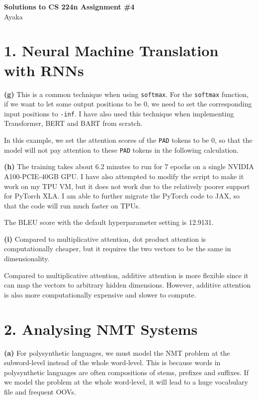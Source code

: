 \documentclass[a4paper,12pt]{report}
\author{Ayaka}
\begin{document}
\begin{center}
	{\Large{\textbf{Solutions to CS 224n Assignment \#4}}} \\
	\vspace{1em}
	{Ayaka}
\end{center}

\section*{1. Neural Machine Translation with RNNs}

\textbf{(g)} This is a common technique when using \texttt{softmax}. For the \texttt{softmax} function, if we want to let some output positions to be 0, we need to set the corresponding input positions to \texttt{-inf}. I have also used this technique when implementing Transformer, BERT and BART from scratch.

In this example, we set the attention scores of the \texttt{PAD} tokens to be 0, so that the model will not pay attention to these \texttt{PAD} tokens in the following calculation.

\textbf{(h)} The training takes about 6.2 minutes to run for 7 epochs on a single NVIDIA A100-PCIE-40GB GPU. I have also attempted to modify the script to make it work on my TPU VM, but it does not work due to the relatively poorer support for PyTorch XLA. I am able to further migrate the PyTorch code to JAX, so that the code will run much faster on TPUs.

The BLEU score with the default hyperparameter setting is 12.9131.

\textbf{(i)} Compared to multiplicative attention, dot product attention is computationally cheaper, but it requires the two vectors to be the same in dimensionality.

Compared to multiplicative attention, additive attention is more flexible since it can map the vectors to arbitrary hidden dimensions. However, additive attention is also more computationally expensive and slower to compute.

\section*{2. Analysing NMT Systems}

\textbf{(a)} For polysynthetic languages, we must model the NMT problem at the subword-level instead of the whole word-level. This is because words in polysynthetic languages are often compositions of stems, prefixes and suffixes. If we model the problem at the whole word-level, it will lead to a huge vocabulary file and frequent OOVs.
\end{document}
